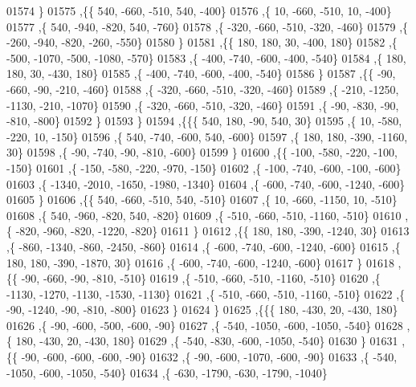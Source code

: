 \begin{DoxyCode}
01574     \}
01575    ,\{\{   540,  -660,  -510,   540,  -400\}
01576     ,\{    10,  -660,  -510,    10,  -400\}
01577     ,\{   540,  -940,  -820,   540,  -760\}
01578     ,\{  -320,  -660,  -510,  -320,  -460\}
01579     ,\{  -260,  -940,  -820,  -260,  -550\}
01580     \}
01581    ,\{\{   180,   180,    30,  -400,   180\}
01582     ,\{  -500, -1070,  -500, -1080,  -570\}
01583     ,\{  -400,  -740,  -600,  -400,  -540\}
01584     ,\{   180,   180,    30,  -430,   180\}
01585     ,\{  -400,  -740,  -600,  -400,  -540\}
01586     \}
01587    ,\{\{   -90,  -660,   -90,  -210,  -460\}
01588     ,\{  -320,  -660,  -510,  -320,  -460\}
01589     ,\{  -210, -1250, -1130,  -210, -1070\}
01590     ,\{  -320,  -660,  -510,  -320,  -460\}
01591     ,\{   -90,  -830,   -90,  -810,  -800\}
01592     \}
01593    \}
01594   ,\{\{\{   540,   180,   -90,   540,    30\}
01595     ,\{    10,  -580,  -220,    10,  -150\}
01596     ,\{   540,  -740,  -600,   540,  -600\}
01597     ,\{   180,   180,  -390, -1160,    30\}
01598     ,\{   -90,  -740,   -90,  -810,  -600\}
01599     \}
01600    ,\{\{  -100,  -580,  -220,  -100,  -150\}
01601     ,\{  -150,  -580,  -220,  -970,  -150\}
01602     ,\{  -100,  -740,  -600,  -100,  -600\}
01603     ,\{ -1340, -2010, -1650, -1980, -1340\}
01604     ,\{  -600,  -740,  -600, -1240,  -600\}
01605     \}
01606    ,\{\{   540,  -660,  -510,   540,  -510\}
01607     ,\{    10,  -660, -1150,    10,  -510\}
01608     ,\{   540,  -960,  -820,   540,  -820\}
01609     ,\{  -510,  -660,  -510, -1160,  -510\}
01610     ,\{  -820,  -960,  -820, -1220,  -820\}
01611     \}
01612    ,\{\{   180,   180,  -390, -1240,    30\}
01613     ,\{  -860, -1340,  -860, -2450,  -860\}
01614     ,\{  -600,  -740,  -600, -1240,  -600\}
01615     ,\{   180,   180,  -390, -1870,    30\}
01616     ,\{  -600,  -740,  -600, -1240,  -600\}
01617     \}
01618    ,\{\{   -90,  -660,   -90,  -810,  -510\}
01619     ,\{  -510,  -660,  -510, -1160,  -510\}
01620     ,\{ -1130, -1270, -1130, -1530, -1130\}
01621     ,\{  -510,  -660,  -510, -1160,  -510\}
01622     ,\{   -90, -1240,   -90,  -810,  -800\}
01623     \}
01624    \}
01625   ,\{\{\{   180,  -430,    20,  -430,   180\}
01626     ,\{   -90,  -600,  -500,  -600,   -90\}
01627     ,\{  -540, -1050,  -600, -1050,  -540\}
01628     ,\{   180,  -430,    20,  -430,   180\}
01629     ,\{  -540,  -830,  -600, -1050,  -540\}
01630     \}
01631    ,\{\{   -90,  -600,  -600,  -600,   -90\}
01632     ,\{   -90,  -600, -1070,  -600,   -90\}
01633     ,\{  -540, -1050,  -600, -1050,  -540\}
01634     ,\{  -630, -1790,  -630, -1790, -1040\}

\end{DoxyCode}
